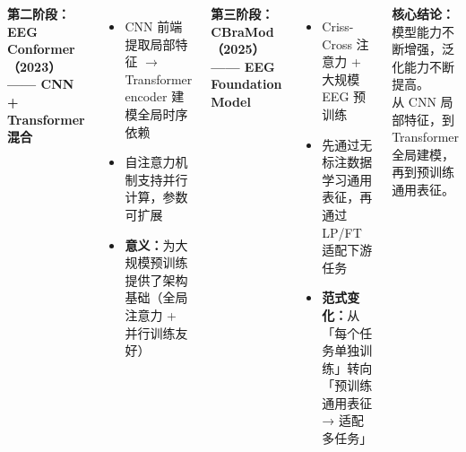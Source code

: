 \documentclass[25pt, a0paper, portrait, margin=15mm, innermargin=15mm, blockverticalspace=10mm]{tikzposter}
\begin{document}
\begin{columns}
{    \vspace{2mm}
    \textbf{第二阶段：EEG Conformer（2023）—— CNN + Transformer 混合}

    \begin{itemize}
        \item CNN 前端提取局部特征 $\rightarrow$ Transformer encoder 建模全局时序依赖
        \item 自注意力机制支持并行计算，参数可扩展
        \item \textbf{意义：}为大规模预训练提供了架构基础（全局注意力 + 并行训练友好）
    \end{itemize}

    \vspace{2mm}
    \textbf{第三阶段：CBraMod（2025）—— EEG Foundation Model}

    \begin{itemize}
        \item Criss-Cross 注意力 + 大规模 EEG 预训练
        \item 先通过无标注数据学习通用表征，再通过 LP/FT 适配下游任务
        \item \textbf{范式变化：}从「每个任务单独训练」转向「预训练通用表征 → 适配多任务」
    \end{itemize}

    \vspace{3mm}
    {\centering
    \colorbox{myblue!10}{\parbox{0.9\linewidth}{
        \centering
        \textbf{核心结论：}模型能力不断增强，泛化能力不断提高。\\
        从 CNN 局部特征，到 Transformer 全局建模，再到预训练通用表征。
    }}
    \par}
}


\end{columns}
\end{document}
